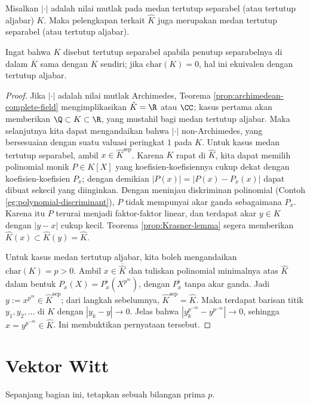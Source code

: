 \begin{corollary}\label{prop:complete-alg-closed}
	Misalkan $|\cdot|$ adalah nilai mutlak pada medan tertutup separabel (atau tertutup aljabar) $K$. Maka pelengkapan terkait $\hat{K}$ juga merupakan medan tertutup separabel (atau tertutup aljabar).
\end{corollary}
Ingat bahwa $K$ disebut tertutup separabel apabila penutup separabelnya di dalam $\overline{K}$ sama dengan $K$ sendiri; jika $\text{char}(K)=0$, hal ini ekuivalen dengan tertutup aljabar.

\begin{proof}
	Jika $|\cdot|$ adalah nilai mutlak Archimedes, Teorema \ref{prop:archimedean-complete-field} mengimplikasikan $\hat{K}=\R$ atau $\CC$; kasus pertama akan memberikan $\Q \subset K \subset \R$, yang mustahil bagi medan tertutup aljabar. Maka selanjutnya kita dapat mengandaikan bahwa $|\cdot|$ non-Archimedes, yang bersesuaian dengan suatu valuasi peringkat $1$ pada $K$. Untuk kasus medan tertutup separabel, ambil $x \in \hat{K}^{\text{sep}}$. Karena $K$ rapat di $\hat{K}$, kita dapat memilih polinomial monik $P \in K[X]$ yang koefisien-koefisiennya cukup dekat dengan koefisien-koefisien $P_x$; dengan demikian $|P(x)|=|P(x)-P_x(x)|$ dapat dibuat sekecil yang diinginkan. Dengan meninjau diskriminan polinomial (Contoh \ref{eg:polynomial-discriminant}), $P$ tidak mempunyai akar ganda sebagaimana $P_x$. Karena itu $P$ terurai menjadi faktor-faktor linear, dan terdapat akar $y \in K$ dengan $|y-x|$ cukup kecil. Teorema \ref{prop:Krasner-lemma} segera memberikan $\hat{K}(x) \subset \hat{K}(y) = \hat{K}$.

	Untuk kasus medan tertutup aljabar, kita boleh mengandaikan $\text{char}(K) = p > 0$. Ambil $x \in \overline{\hat{K}}$ dan tuliskan polinomial minimalnya atas $\hat{K}$ dalam bentuk $P_x(X) = P_x^\flat(X^{p^m})$, dengan $P_x^\flat$ tanpa akar ganda. Jadi $y := x^{p^m} \in \hat{K}^{\text{sep}}$; dari langkah sebelumnya, $\hat{K}^{\text{sep}} = \hat{K}$. Maka terdapat barisan titik $y_1, y_2, \ldots$ di $K$ dengan $|y_k - y| \to 0$. Jelas bahwa $\left| y_k^{p^{-m}} - y^{p^{-m}} \right| \to 0$, sehingga $x = y^{p^{-m}} \in \hat{K}$. Ini membuktikan pernyataan tersebut.
\end{proof}

\section{Vektor Witt}\label{sec:Witt-vector}
Sepanjang bagian ini, tetapkan sebuah bilangan prima $p$.

